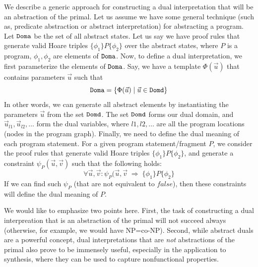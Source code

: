 \documentclass[preprint]{sig-alternate-05-2015}
\def\domd{{\tt{Domd}}}
\def\doma{{\tt{Doma}}}
\begin{document}
We describe a generic approach for constructing a dual interpretation
that will be an abstraction of the primal. 
Let us assume we have some general technique (such as, predicate
abstraction or abstract interpretation) for abstracting a program.
Let $\doma$ be the set of all abstract states.
Let us say we have proof rules that generate valid Hoare triples
$\{\phi_1\}P\{\phi_2\}$ over the abstract states, where $P$ is a program,
$\phi_1,\phi_2$ are elements of $\doma$.
Now, to define a dual interpretation, we first parameterize the elements
of $\doma$. Say, we have a template $\Phi(\vec{u})$ that contains parameters
$\vec{u}$ such that 
$$\doma = \{\Phi(\vec{u}) \mid \vec{u}\in\domd\}$$
In other words, we can generate all abstract elements
by instantiating the parameters $\vec{u}$ from the set $\domd$.
The set $\domd$ forms our dual domain, and 
$\vec{u}_{l1},\vec{u}_{l2},\ldots$ form the dual variables, where
$l1,l2,\ldots$ are all the program locations (nodes in the program graph).
Finally, we need to define the dual meaning of each program statement.
For a given program statement/fragment $P$, we consider the proof rules
that generate valid Hoare triples $\{\phi_1\}P\{\phi_2\}$, and generate
a constraint $\psi_P(\vec{u},\vec{v})$ such that the following holds:
$$
 \forall \vec{u},\vec{v}:
 \psi_P(\vec{u},\vec{v} \;\Rightarrow\;
   \{\phi_1\}P\{\phi_2\}
$$
If we can find such $\psi_P$ (that are not equivalent to $\mathit{false}$),
then these constraints will define the dual meaning of $P$.

We would like to emphasize two points here. 
First,
the task of constructing a dual interpreation that
is an abstraction of the primal will not succeed always (otherwise,
for example, we would have NP=co-NP). 
Second, while abstract duals are a powerful concept, dual interpretations
that are {\em{not}} abstractions of the primal also prove to be
immensely useful, especially in the application to synthesis, where they
can be used to capture nonfunctional properties.
\end{document}
